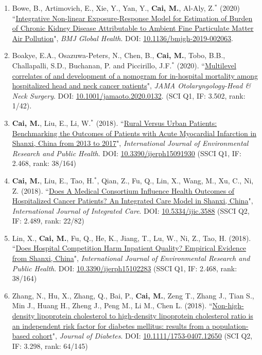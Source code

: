 \documentclass[11pt, a4paper]{article}
\newcommand{\years}[1]{\marginnote{\scriptsize #1}}
\begin{document}
\begin{enumerate}[leftmargin=0ex,itemsep=1ex]
		\item Bowe, B., Artimovich, E., Xie, Y., Yan, Y., \textbf{Cai, M.}, Al-Aly, Z.$^\ast$ (2020) ``\ul{Integrative Non-linear Exposure-Response Model for Estimation of Burden of Chronic Kidney Disease Attributable to Ambient Fine Particulate Matter Air Pollution}", \emph{BMJ Global Health}. DOI: \href{https://doi.org/10.1136/bmjgh-2019-002063}{10.1136/bmjgh-2019-002063}. 
		
		\item Boakye, E.A., Osazuwa-Peters, N., Chen, B., \textbf{Cai, M.}, Tobo, B.B., Challapalli, S.D., Buchanan, P. and Piccirillo, J.F.$^\ast$ (2020). ``\ul{Multilevel correlates of and development of a nomogram for in-hospital mortality among hospitalized head and neck cancer patients}", \emph{JAMA Otolaryngology-Head \& Neck Surgery}. DOI: \href{https://doi.org/10.1001/jamaoto.2020.0132}{10.1001/jamaoto.2020.0132}. (SCI Q1, IF: 3.502, rank: 1/42).
		
		
		
		\item \textcolor{RubineRed}{\textbf{Cai, M.}}, Liu, E., Li, W.$^\ast$ (2018). ``\ul{Rural Versus Urban Patients: Benchmarking the Outcomes of Patients with Acute Myocardial Infarction in Shanxi, China from 2013 to 2017}", \emph{International Journal of Environmental Research and Public Health}. DOI: \href{https://doi.org/10.3390/ijerph15091930}{10.3390/ijerph15091930} (SSCI Q1, IF: 2.468, rank: 38/164)
		
		\item \textcolor{RubineRed}{\textbf{Cai, M.}}, Liu, E., Tao, H.$^\ast$, Qian, Z., Fu, Q., Lin, X., Wang, M., Xu, C., Ni, Z. (2018). ``\ul{Does A Medical Consortium Influence Health Outcomes of Hospitalized Cancer Patients? An Integrated Care Model in Shanxi, China}", \emph{International Journal of Integrated Care}. DOI: \href{https://doi.org/10.5334/ijic.3588}{10.5334/ijic.3588} (SSCI Q2, IF: 2.489, rank: 22/82)
		
		\item \years{2018}Lin, X., \textbf{Cai, M.}, Fu, Q., He, K., Jiang, T., Lu, W., Ni, Z., Tao, H. (2018). ``\ul{Does Hospital Competition Harm Inpatient Quality? Empirical Evidence from Shanxi, China}", \emph{International Journal of Environmental Research and Public Health}. DOI: \href{https://doi.org/10.3390/ijerph15102283}{10.3390/ijerph15102283} (SSCI Q1, IF: 2.468, rank: 38/164)
		
		\item Zhang, N., Hu, X., Zhang, Q., Bai, P., \textbf{Cai, M.}, Zeng T., Zhang J., Tian S., Min J., Huang H., Zheng J., Peng M., Li M., Chen L. (2018). ``\ul{Non-high-density lipoprotein cholesterol to high-density lipoprotein cholesterol ratio is an independent risk factor for diabetes mellitus: results from a population-based cohort}", \emph{Journal of Diabetes}. DOI: \href{https://doi.org/10.1111/1753-0407.12650}{10.1111/1753-0407.12650} (SCI Q2, IF: 3.298, rank: 64/145)
		

\end{enumerate}
\end{document}
